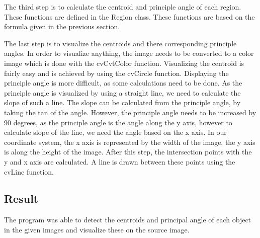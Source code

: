 \documentclass[letter,12pt]{article}
\begin{document}
The third step is to calculate the centroid and principle angle of each region.  These functions are defined in the Region class.  These functions are based on the formula given in the previous section.

The last step is to visualize the centroids and there corresponding principle angles.  In order to visualize anything, the image needs to be converted to a color image which is done with the cvCvtColor function.  Visualizing the centroid is fairly easy and is achieved by using the cvCircle function.  Displaying the principle angle is more difficult, as some calculations need to be done.  As the principle angle is visualized by using a straight line, we need to calculate the slope of such a line.  The slope can be calculated from the principle angle, by taking the tan of the angle.  However, the principle angle needs to be increased by 90 degrees, as the principle angle is the angle along the y axis, however to calculate slope of the line, we need the angle based on the x axis. In our coordinate system, the x axis is represented by the width of the image, the y axis is along the height of the image.   After this step, the intersection points with the y and x axis are calculated.  A line is drawn between these points using the cvLine function.


\subsection{Result}
The program was able to detect the centroids and principal angle of each object in the given images and visualize these on the source image.  
\end{document}
